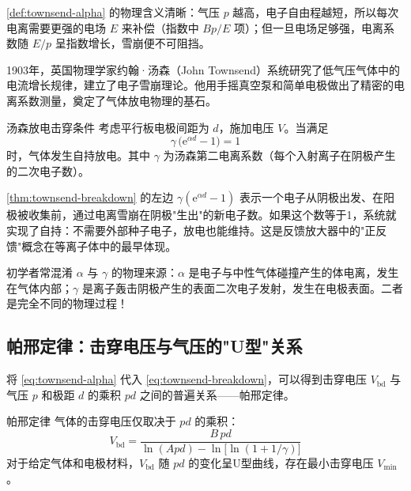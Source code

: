 \documentclass[12pt,a4paper,openany,oneside]{book}
\newcommand{\ee}{\mathrm{e}}
\begin{document}
\begin{insight}{}{}
\cref{def:townsend-alpha} 的物理含义清晰：气压 $p$ 越高，电子自由程越短，所以每次电离需要更强的电场 $E$ 来补偿（指数中 $Bp/E$ 项）；但一旦电场足够强，电离系数随 $E/p$ 呈指数增长，雪崩便不可阻挡。
\end{insight}

\begin{history}{}{}
1903年，英国物理学家约翰·汤森（John Townsend）系统研究了低气压气体中的电流增长规律，建立了电子雪崩理论。他用手摇真空泵和简单电极做出了精密的电离系数测量，奠定了气体放电物理的基石。
\end{history}

\begin{theorem}{汤森放电击穿条件}{}{}
\label{thm:townsend-breakdown}
考虑平行板电极间距为 $d$，施加电压 $V$。当满足
\begin{equation}
\label{eq:townsend-breakdown}
\gamma \,\bigl(\ee^{\alpha d} - 1\bigr) = 1
\end{equation}
时，气体发生自持放电。其中 $\gamma$ 为汤森第二电离系数（每个入射离子在阴极产生的二次电子数）。
\end{theorem}

\begin{insight}{}{}
\cref{thm:townsend-breakdown} 的左边 $\gamma(\ee^{\alpha d}-1)$ 表示一个电子从阴极出发、在阳极被收集前，通过电离雪崩在阴极"生出"的新电子数。如果这个数等于1，系统就实现了自持：不需要外部种子电子，放电也能维持。这是反馈放大器中的"正反馈"概念在等离子体中的最早体现。
\end{insight}

\begin{warning}{}{}
初学者常混淆 $\alpha$ 与 $\gamma$ 的物理来源：$\alpha$ 是电子与中性气体碰撞产生的体电离，发生在气体内部；$\gamma$ 是离子轰击阴极产生的表面二次电子发射，发生在电极表面。二者是完全不同的物理过程！
\end{warning}

\subsection{帕邢定律：击穿电压与气压的"U型"关系}

将 \cref{eq:townsend-alpha} 代入 \cref{eq:townsend-breakdown}，可以得到击穿电压 $V_{\text{bd}}$ 与气压 $p$ 和极距 $d$ 的乘积 $pd$ 之间的普遍关系——帕邢定律。

\begin{theorem}{帕邢定律}{}{}
\label{thm:paschen-law}
气体的击穿电压仅取决于 $pd$ 的乘积：
\begin{equation}
\label{eq:paschen-law}
V_{\text{bd}} = \frac{B\,pd}{\ln(Apd) - \ln\!\bigl[\ln(1+1/\gamma)\bigr]}
\end{equation}
对于给定气体和电极材料，$V_{\text{bd}}$ 随 $pd$ 的变化呈U型曲线，存在最小击穿电压 $V_{\text{min}}$。
\end{theorem}
\end{document}
